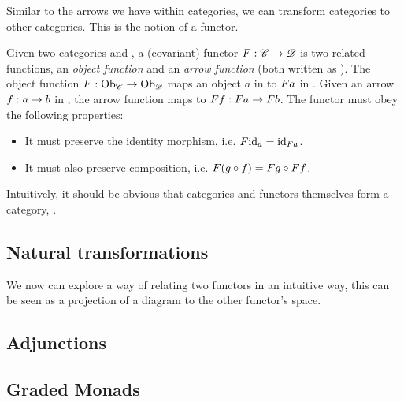 Similar to the arrows we have within categories, we can transform categories to other categories. This is the notion of a functor.
\begin{covfunctordef}
  Given two categories  and , a (covariant) functor $\mathnormal{F}: \mathscr{C} \to \mathscr{D}$ is two related functions, an \emph{object function} and an \emph{arrow function} (both written as ). The object function $\mathnormal{F}: \mathrm{Ob}_{\mathscr{C}} \to \mathrm{Ob}_{\mathscr{D}}$ maps an object $a$ in  to $\mathnormal{F} \mathnormal{a}$ in . Given an arrow $\mathnormal{f}: \mathnormal{a} \to \mathnormal{b}$ in , the arrow function maps  to $\mathnormal{F} \mathnormal{f}: \mathnormal{F} \mathnormal{a} \to \mathnormal{F} \mathnormal{b}$. The functor must obey the following properties: 
  \begin{itemize}
    \item It must preserve the identity morphism, i.e. $\mathnormal{F} \mathnormal{\mathrm{id}_{\mathnormal{a}}} = \mathrm{id}_{\mathnormal{\mathnormal{F} \mathnormal{a}}}$.
    \item It must also preserve composition, i.e. $\mathnormal{F} \mathnormal{\left(\mathnormal{g} \circ \mathnormal{f}\right)} = \mathnormal{F} \mathnormal{\mathnormal{g}} \circ \mathnormal{F} \mathnormal{\mathnormal{f}}$.
  \end{itemize}
\end{covfunctordef}

Intuitively, it should be obvious that categories and functors themselves form a category, .\\

\subsection{Natural transformations}
\theoremstyle{definition}\newtheorem*{nattransdef}{Natural Transformation}
We now can explore a way of relating two functors in an intuitive way, this can be seen as a projection of a diagram to the other functor's space. 
\subsection{Adjunctions}
\subsection{Graded Monads}\label{sec:gradedmonads}